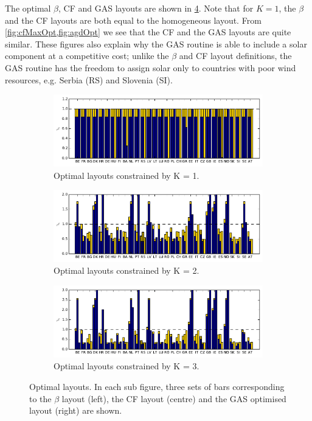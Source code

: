 \documentclass[a4paper, 5p, sort&compress]{elsarticle}%
\newcommand{\chromowidth}{1.00 \columnwidth}
\begin{document}
The optimal $\beta$, CF and GAS layouts are shown in
\cref{fig:optLayouts}. Note that for $K=1$, the $\beta$ and the
CF layouts are both equal to the homogeneous layout. From
\cref{fig:cfMaxOpt,fig:agdOpt} we see that the CF and the GAS
layouts are quite similar. These figures also explain why the GAS
routine is able to include a solar component at a competitive cost;
unlike the $\beta$ and CF layout definitions, the GAS routine has
the freedom to assign solar only to countries with poor wind
resources, e.g. Serbia (RS) and Slovenia (SI). 


\begin{figure}[p!]
  \centering
  \begin{subfigure}{2\columnwidth}
    \includegraphics[width = \chromowidth, center]{k=1-layouts}
    \caption{Optimal layouts constrained by K = 1.}
    \label{fig:betaOpt}    
  \end{subfigure}
  \begin{subfigure}{2\columnwidth}
    \includegraphics[width = \chromowidth, center]{k=2-layouts}
    \caption{Optimal layouts constrained by K = 2.}
    \label{fig:cfMaxOpt}    
  \end{subfigure}
  \begin{subfigure}{2\columnwidth}
    \includegraphics[width = \chromowidth, center]{k=3-layouts}
    \caption{Optimal layouts constrained by K = 3.}
    \label{fig:agdOpt}    
  \end{subfigure}
  \caption{Optimal layouts. In each sub figure, three sets of bars
    corresponding to the $\beta$ layout (left), the CF layout (centre) and
    the GAS optimised layout (right) are shown.}
  \label{fig:optLayouts}
\end{figure}
\end{document}
